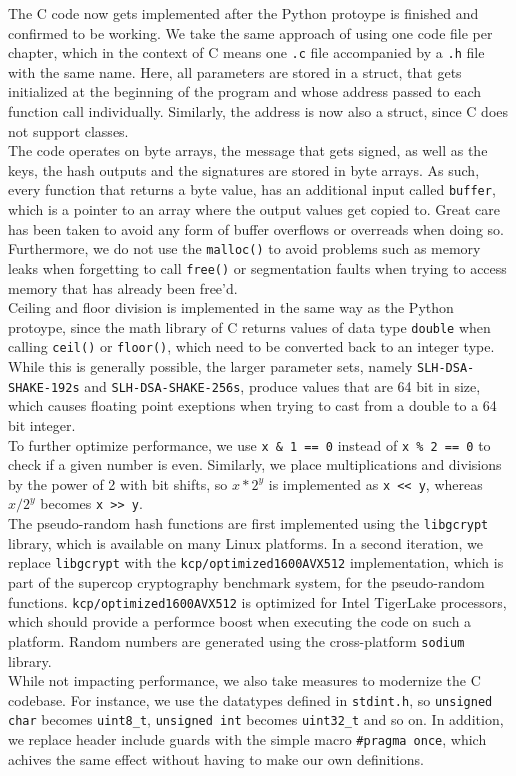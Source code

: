 \documentclass[journal=tosc,notanonymous]{iacrtrans}
\begin{document}
The C code now gets implemented after the Python protoype is finished and confirmed to be working.
We take the same approach of using one code file per chapter, which in the context of C means one \texttt{.c} file accompanied by a \texttt{.h} file with the same name.
Here, all parameters are stored in a struct, that gets initialized at the beginning of the program and whose address passed to each function call individually.
Similarly, the address is now also a struct, since C does not support classes.
\\
The code operates on byte arrays, the message that gets signed, as well as the keys, the hash outputs and the signatures are stored in byte arrays.
As such, every function that returns a byte value, has an additional input called \texttt{buffer}, which is a pointer to an array where the output values get copied to.
Great care has been taken to avoid any form of buffer overflows or overreads when doing so.
Furthermore, we do not use the \texttt{malloc()} to avoid problems such as memory leaks when forgetting to call \texttt{free()} or segmentation faults when trying to access memory that has already been free'd.
\\
Ceiling and floor division is implemented in the same way as the Python protoype, since the math library of C returns values of data type \texttt{double} when calling \texttt{ceil()} or \texttt{floor()}, which need to be converted back to an integer type.
While this is generally possible, the larger parameter sets, namely \texttt{SLH-DSA-SHAKE-192s} and \texttt{SLH-DSA-SHAKE-256s}, produce values that are 64 bit in size, which causes floating point exeptions when trying to cast from a double to a 64 bit integer.
\\
To further optimize performance, we use \texttt{x \& 1 == 0} instead of \texttt{x \% 2 == 0} to check if a given number is even.
Similarly, we place multiplications and divisions by the power of 2 with bit shifts, so $x * 2^y$ is implemented as \texttt{x << y}, whereas $x / 2^y$ becomes \texttt{x >> y}.
\\
The pseudo-random hash functions are first implemented using the \texttt{libgcrypt} library, which is available on many Linux platforms.
In a second iteration, we replace \texttt{libgcrypt} with the \texttt{kcp/optimized1600AVX512} implementation, which is part of the supercop cryptography benchmark system, for the pseudo-random functions.
\texttt{kcp/optimized1600AVX512} is optimized for Intel TigerLake processors, which should provide a performce boost when executing the code on such a platform.
Random numbers are generated using the cross-platform \texttt{sodium} library.
\\
While not impacting performance, we also take measures to modernize the C codebase.
For instance, we use the datatypes defined in \texttt{stdint.h}, so \texttt{unsigned char} becomes \texttt{uint8\_t}, \texttt{unsigned int} becomes \texttt{uint32\_t} and so on.
In addition, we replace header include guards with the simple macro \texttt{\#pragma once}, which achives the same effect without having to make our own definitions.
\end{document}
